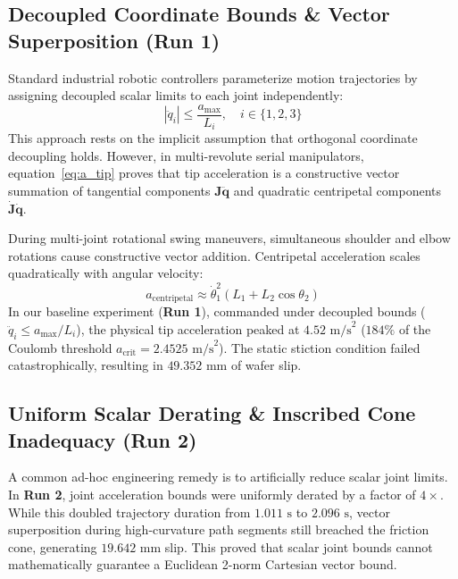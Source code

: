\documentclass{article}
\begin{document}
\subsection{Decoupled Coordinate Bounds \& Vector Superposition (Run 1)}
Standard industrial robotic controllers parameterize motion trajectories by assigning decoupled scalar limits to each joint independently:
\begin{equation}
|\ddot{q}_i| \le \frac{a_{\max}}{L_i}, \quad i \in \{1, 2, 3\}
\label{eq:decoupled_limits}
\end{equation}
This approach rests on the implicit assumption that orthogonal coordinate decoupling holds. However, in multi-revolute serial manipulators, equation~\eqref{eq:a_tip} proves that tip acceleration is a constructive vector summation of tangential components $\mathbf{J}\ddot{\mathbf{q}}$ and quadratic centripetal components $\dot{\mathbf{J}}\dot{\mathbf{q}}$.

During multi-joint rotational swing maneuvers, simultaneous shoulder and elbow rotations cause constructive vector addition. Centripetal acceleration scales quadratically with angular velocity:
\begin{equation}
a_{\text{centripetal}} \approx \dot{\theta}_1^2 (L_1 + L_2 \cos\theta_2)
\end{equation}
In our baseline experiment (\textbf{Run 1}), commanded under decoupled bounds ($\ddot{q}_i \le a_{\max}/L_i$), the physical tip acceleration peaked at $4.52\text{ m/s}^2$ ($184\%$ of the Coulomb threshold $a_{\text{crit}} = 2.4525\text{ m/s}^2$). The static stiction condition failed catastrophically, resulting in $49.352\text{ mm}$ of wafer slip.

\subsection{Uniform Scalar Derating \& Inscribed Cone Inadequacy (Run 2)}
A common ad-hoc engineering remedy is to artificially reduce scalar joint limits. In \textbf{Run 2}, joint acceleration bounds were uniformly derated by a factor of $4\times$. While this doubled trajectory duration from $1.011\text{ s}$ to $2.096\text{ s}$, vector superposition during high-curvature path segments still breached the friction cone, generating $19.642\text{ mm}$ slip. This proved that scalar joint bounds cannot mathematically guarantee a Euclidean 2-norm Cartesian vector bound.
\end{document}
